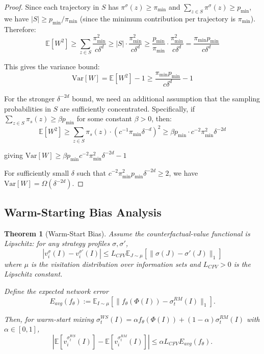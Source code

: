 \documentclass[12pt,a4paper]{article}
\newtheorem{theorem}{Theorem}[section]
\begin{document}
\begin{proof}
Since each trajectory in $S$ has $\pi^{\sigma}(z) \geq \pi_{\min}$ and $\sum_{z \in S} \pi^{\sigma}(z) \geq p_{\min}$, we have $|S| \geq p_{\min}/\pi_{\min}$ (since the minimum contribution per trajectory is $\pi_{\min}$). Therefore:
$$\mathbb{E}[W^2] \geq \sum_{z \in S} \frac{\pi_{\min}^2}{c\delta^{d}} \geq |S| \cdot \frac{\pi_{\min}^2}{c\delta^{d}} \geq \frac{p_{\min}}{\pi_{\min}} \cdot \frac{\pi_{\min}^2}{c\delta^{d}} = \frac{\pi_{\min} p_{\min}}{c\delta^{d}}$$

This gives the variance bound:
$$\text{Var}[W] = \mathbb{E}[W^2] - 1 \geq \frac{\pi_{\min} p_{\min}}{c\delta^{d}} - 1$$

For the stronger $\delta^{-2d}$ bound, we need an additional assumption that the sampling probabilities in $S$ are sufficiently concentrated. Specifically, if $\sum_{z \in S} \pi_s(z) \geq \beta p_{\min}$ for some constant $\beta > 0$, then:
$$\mathbb{E}[W^2] \geq \sum_{z \in S} \pi_s(z) \cdot (c^{-1}\pi_{\min}\delta^{-d})^2 \geq \beta p_{\min} \cdot c^{-2}\pi_{\min}^2\delta^{-2d}$$

giving $\text{Var}[W] \geq \beta p_{\min} c^{-2}\pi_{\min}^2 \delta^{-2d} - 1$

For sufficiently small $\delta$ such that $c^{-2}\pi_{\min}^2 p_{\min} \delta^{-2d} \geq 2$, we have $\text{Var}[W] = \Omega(\delta^{-2d})$.
\end{proof}

\subsection{Warm-Starting Bias Analysis}

\begin{theorem}[Warm-Start Bias]
\label{thm:warmstart_bias}
Assume the counterfactual-value functional is Lipschitz: for any strategy profiles $\sigma, \sigma'$,
$$|v_i^\sigma(I) - v_i^{\sigma'}(I)| \leq L_{CFV} \mathbb{E}_{J \sim \mu}[\|\sigma(J) - \sigma'(J)\|_1]$$
where $\mu$ is the visitation distribution over information sets and $L_{CFV} > 0$ is the Lipschitz constant.

Define the expected network error
$$E_{avg}(f_\theta) := \mathbb{E}_{I \sim \mu}[\|f_\theta(\Phi(I)) - \sigma_t^{RM}(I)\|_1].$$

Then, for warm-start mixing $\sigma_t^{WS}(I) = \alpha f_\theta(\Phi(I)) + (1-\alpha) \sigma_t^{RM}(I)$ with $\alpha \in [0,1]$,
$$|\mathbb{E}[v_i^{\sigma_t^{WS}}(I)] - \mathbb{E}[v_i^{\sigma_t^{RM}}(I)]| \leq \alpha L_{CFV} E_{avg}(f_\theta).$$
\end{theorem}
\end{document}
